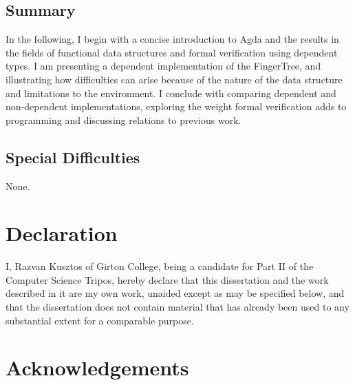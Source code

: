 \documentclass[12pt,twoside,notitlepage]{report}
\begin{document}
\subsection*{Summary}
In the following, I begin with a concise introduction to Agda and the results in the fields of functional data structures and 
formal verification using dependent types. I am presenting a dependent implementation of the FingerTree, and illustrating how difficulties can arise because of the nature of the data structure and limitations to the environment. I conclude with  comparing dependent and non-dependent implementations, exploring the weight formal verification adds to programming and discussing relations to previous work.    

\subsection*{Special Difficulties}
None.


\newpage
\section*{Declaration}

I, Razvan Kusztos of Girton College, being a candidate for Part II of the Computer
Science Tripos, hereby declare
that this dissertation and the work described in it are my own work,
unaided except as may be specified below, and that the dissertation
does not contain material that has already been used to any substantial
extent for a comparable purpose.

\bigskip
{}

\medskip
{}

\cleardoublepage

\tableofcontents

\listoffigures

\newpage
\section*{Acknowledgements}


\cleardoublepage        %
\end{document}
